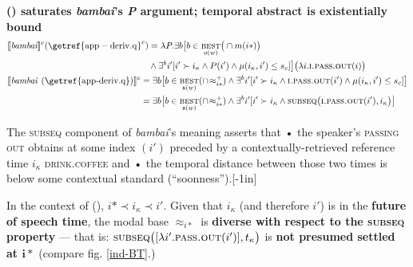 \a \textbf{ () saturates \textit{bambai}'s \textit{P} argument; temporal abstract is existentially bound}
\begin{align*}
	&\begin{aligned}
	\denote[c]{\textit{bambai}}(\mathrm{\getref{app-deriv.q}}^c )&=\lambda\textit{P}.\exists b	\big[b\in\underset{o(w)}{\textsc{best}}\big(\cap m(i*)\big)\\&\wedge \exists^bi'[i'\succ i_\kappa\wedge P(i')\wedge\mu(i_\kappa,i')\leq s_c]\big]\big(\lambda i.\textsc{i.pass.out}(i)\big)\end{aligned}\\
&\begin{aligned}\denote[c]{\textit{bambai \textup{(\getref{app-deriv.q})}}}&=\exists b\big[b\in\underset{\mathfrak s(w)}{\textsc{best}}(\cap\!\approx^+_{i*})\wedge \exists^bi'[i'\succ i_\kappa\wedge\textsc{i.pass.out}(i')\wedge\mu(i_\kappa,i')\leq s_c]\big]\\
	&=\exists b\big[b\in\underset{\mathfrak s(w)}{\textsc{best}}(\cap\!\approx^+_{i*})\wedge \exists^bi'[i'\succ i_\kappa\wedge \textsc{subseq}\big(\textsc{i.pass.out}(i'),i_\kappa\big)\big]\end{aligned}
\end{align*}




The \textsc{subseq} component of \textit{bambai}'s meaning asserts that • the speaker's \textsc{passing out} obtains at some index $ (i') $ preceded by a contextually-retrieved reference time $ i_\kappa $ \textsc{drink.coffee} and • the temporal distance between those two times is below some contextual standard (``soonness'').[-1in]


\xe


In the context of (), $ i*\prec i_\kappa\prec i' $. Given that $ i_\kappa $ (and therefore $ i' $) is in the \textbf{future of speech time}, the modal base $ \approx_{i*} $ is \textbf{diverse with respect to the \textsc{subseq} property} --- that is: $ \textsc{subseq}\big([\lambda i'.\textsc{pass.out}(i')],t_\kappa\big) $ is \textbf{not presumed settled at $ \boldsymbol{i*} $} (compare fig. \ref{ind-BT}.)


